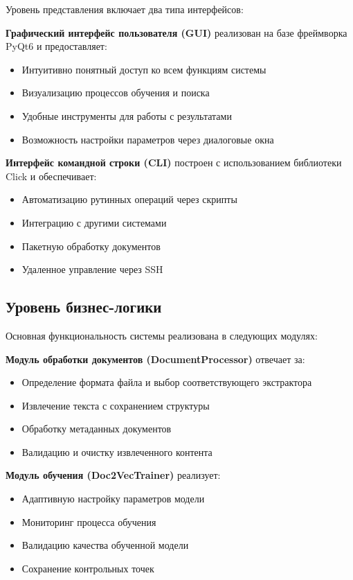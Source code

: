 Уровень представления включает два типа интерфейсов:

\textbf{Графический интерфейс пользователя (GUI)} реализован на базе фреймворка PyQt6 и предоставляет:
\begin{itemize}
	\item Интуитивно понятный доступ ко всем функциям системы
	\item Визуализацию процессов обучения и поиска
	\item Удобные инструменты для работы с результатами
	\item Возможность настройки параметров через диалоговые окна
\end{itemize}

\textbf{Интерфейс командной строки (CLI)} построен с использованием библиотеки Click и обеспечивает:
\begin{itemize}
	\item Автоматизацию рутинных операций через скрипты
	\item Интеграцию с другими системами
	\item Пакетную обработку документов
	\item Удаленное управление через SSH
\end{itemize}

\subsection{Уровень бизнес-логики}

Основная функциональность системы реализована в следующих модулях:

\textbf{Модуль обработки документов (DocumentProcessor)} отвечает за:
\begin{itemize}
	\item Определение формата файла и выбор соответствующего экстрактора
	\item Извлечение текста с сохранением структуры
	\item Обработку метаданных документов
	\item Валидацию и очистку извлеченного контента
\end{itemize}

\textbf{Модуль обучения (Doc2VecTrainer)} реализует:
\begin{itemize}
	\item Адаптивную настройку параметров модели
	\item Мониторинг процесса обучения
	\item Валидацию качества обученной модели
	\item Сохранение контрольных точек
\end{itemize}

